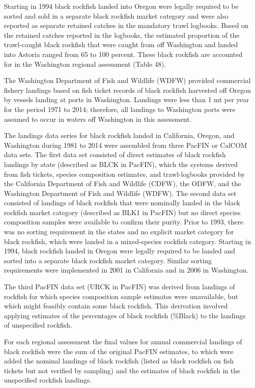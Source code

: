 \documentclass[11pt,
  english,
  letterpaper,
]{article}
\begin{document}
Starting in 1994 black rockfish landed into Oregon were legally required to be sorted and sold in a separate black rockfish market category and were also reported as separate retained catches in the mandatory trawl logbooks. Based on the retained catches reported in the logbooks, the estimated proportion of the trawl-caught black rockfish that were caught from off Washington and landed into Astoria ranged from 65 to 100 percent. These black rockfish are accounted for in the Washington regional assessment (Table 48).

The Washington Department of Fish and Wildlife (WDFW) provided commercial fishery landings based on fish ticket records of black rockfish harvested off Oregon by vessels landing at ports in Washington. Landings were less than 1 mt per year for the period 1971 to 2014; therefore, all landings to Washington ports were assumed to occur in waters off Washington in this assessment.

The landings data series for black rockfish landed in California, Oregon, and Washington during 1981 to 2014 were assembled from three PacFIN or CalCOM data sets. The first data set consisted of direct estimates of black rockfish landings by state (described as BLCK in PacFIN), which the systems derived from fish tickets, species composition estimates, and trawl-logbooks provided by the California Department of Fish and Wildlife (CDFW), the ODFW, and the Washington Department of Fish and Wildlife (WDFW). The second data set consisted of landings of black rockfish that were nominally landed in the black rockfish market category (described as BLK1 in PacFIN) but no direct species composition samples were available to confirm their purity. Prior to 1993, there was no sorting requirement in the states and no explicit market category for black rockfish, which were landed in a mixed-species rockfish category. Starting in 1994, black rockfish landed in Oregon were legally required to be landed and sorted into a separate black rockfish market category. Similar sorting requirements were implemented in 2001 in California and in 2006 in Washington.

The third PacFIN data set (URCK in PacFIN) was derived from landings of rockfish for which species composition sample estimates were unavailable, but which might feasibly contain some black rockfish. This derivation involved applying estimates of the percentages of black rockfish (\%Black) to the landings of unspecified rockfish.

For each regional assessment the final values for annual commercial landings of black rockfish were the sum of the original PacFIN estimates, to which were added the nominal landings of black rockfish (listed as black rockfish on fish tickets but not verified by sampling) and the estimates of black rockfish in the unspecified rockfish landings.
\end{document}
